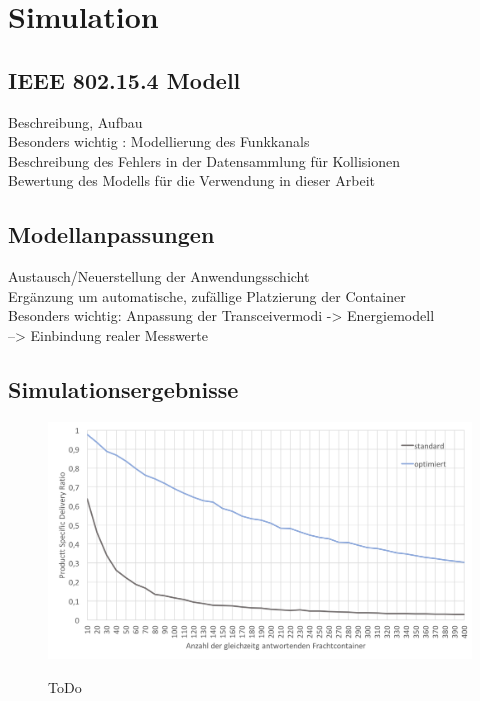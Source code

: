 \chapter{Simulation}\label{kap:simulation}
\section{IEEE 802.15.4 Modell}\label{kap:simulation_sec:beschreibung}
Beschreibung, Aufbau \\
Besonders wichtig : Modellierung des Funkkanals \\
Beschreibung des Fehlers in der Datensammlung für Kollisionen \\
Bewertung des Modells für die Verwendung in dieser Arbeit \\

\section{Modellanpassungen}\label{kap:simulation_sec:anpassung}
Austausch/Neuerstellung der Anwendungsschicht \\
Ergänzung um automatische, zufällige Platzierung der Container \\
Besonders wichtig: Anpassung der Transceivermodi -> Energiemodell \\
--> Einbindung realer Messwerte \\

\section{Simulationsergebnisse}\label{kap:simulation_sec:ergebnisse}
\begin{figure}[bth]
        \myfloatalign
        {\includegraphics[width=1\linewidth]{gfx/Diag_Durchsatz_10_400}} 
        \caption[Durchsatz]{ToDo}\label{fig:diag_durchsatz_10_400}
\end{figure}

